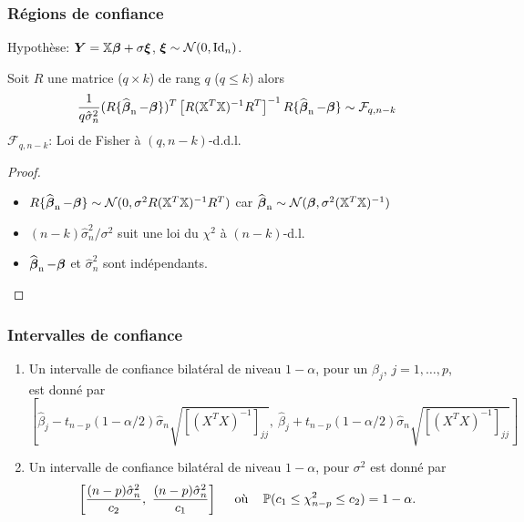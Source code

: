 \begin{frame}
\frametitle{Régions de confiance}
\begin{theo}
\alert{Hypothèse:} $\operatorname{\boldsymbol{Y}}= \mathbb{X} \boldsymbol{\beta} + \sigma \boldsymbol{\xi}$, $\boldsymbol{\xi} \sim \mathcal{N}(0,\mathrm{Id}_{n})$.


Soit $R$ une matrice ($q \times k$) de rang $q$ ($q \leq k$) alors
\[
\frac{1}{q \hat{\sigma}_n^2} (R\{\operatorname{\widehat{\boldsymbol{\beta}}_n}-\boldsymbol{\beta}\})^T \left[ R (\mathbb{X}^T \mathbb{X})^{-1} R^T \right]^{-1} R\{\operatorname{\widehat{\boldsymbol{\beta}}_n}-\boldsymbol{\beta}\}
\sim \mathcal{F}_{q,n-k}
\]
$\mathcal{F}_{q,n-k}$: Loi de Fisher à $(q,n-k)$-d.d.l.
\end{theo}

\begin{proof}
\begin{itemize}
\item $R\{\operatorname{\widehat{\boldsymbol{\beta}}_n}-\boldsymbol{\beta}\} \sim \mathcal{N}( 0, \sigma^2  R (\mathbb{X}^T \mathbb{X})^{-1} R^T)$ car $\operatorname{\widehat{\boldsymbol{\beta}}_n} \sim \mathcal{N}(\boldsymbol{\beta},\sigma^2 (\mathbb{X}^T \mathbb{X})^{-1})$
\item $(n-k) \hat{\sigma}_n^2/\sigma^2$ suit une loi du $\chi^2$ à $(n-k)$-d.l.
\item $\operatorname{\widehat{\boldsymbol{\beta}}_n}-\boldsymbol{\beta}$ et $\hat{\sigma}_n^2$ sont indépendants.
\end{itemize}
\end{proof}
\end{frame}

\begin{frame}
\frametitle{Intervalles de confiance}
\begin{theo}
\begin{enumerate}
\item Un intervalle de confiance bilatéral de niveau $1-\alpha$,  pour un $\beta_{j}$, $j=1,\dots, p$, est donné  par
    $$
    [\hat{\beta}_{j}-t_{n-p}(1-\alpha/2)\hat{\sigma}_n\sqrt{[(X^T X)^{-1}]_{jj}},\ \hat{\beta}_{j}+t_{n-p}(1-\alpha/2)\hat{\sigma}_n\sqrt{[(X^T X)^{-1}]_{jj}}]
    $$
\item Un intervalle de confiance bilatéral de niveau $ 1-\alpha$, pour $\sigma^{2}$  est donné par
$$
\ccint{\frac{(n-p)\hat{\sigma}_n^{2}}{c_{2}},\ \frac{(n-p)\hat{\sigma}_n^{2}}{c_{1}}}\ \quad \text{où} \quad  \PP(c_{1}\leq\chi_{n-p}^{2}\leq c_{2})=1-\alpha.
$$
\end{enumerate}
\end{theo}
\end{frame}


